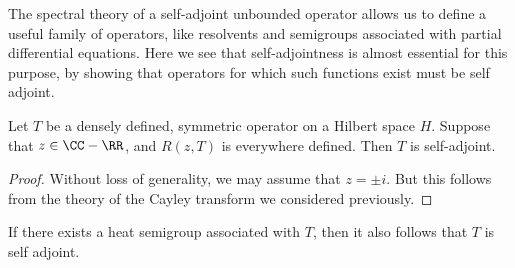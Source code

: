The spectral theory of a self-adjoint unbounded operator allows us to define a useful family of operators, like resolvents and semigroups associated with partial differential equations. Here we see that self-adjointness is almost essential for this purpose, by showing that operators for which such functions exist must be self adjoint.

\begin{theorem}
    Let $T$ be a densely defined, symmetric operator on a Hilbert space $H$. Suppose that $z \in \CC - \RR$, and $R(z,T)$ is everywhere defined. Then $T$ is self-adjoint.
\end{theorem}
\begin{proof}
    Without loss of generality, we may assume that $z = \pm i$. But this follows from the theory of the Cayley transform we considered previously.
\end{proof}

If there exists a heat semigroup associated with $T$, then it also follows that $T$ is self adjoint.

